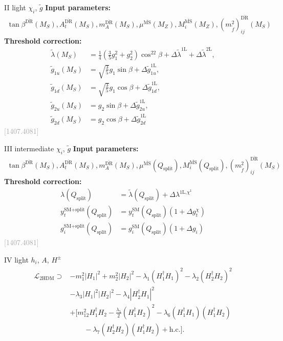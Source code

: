\documentclass[hyperref={pdfpagelabels=false},ngerman]{beamer}
\newcommand{\MS}{\ensuremath{M_S}}
\newcommand{\bigcite}[1]{\textcolor{darkgray}{[#1]}}
\renewcommand{\emph}{\textbf}
\newcommand{\DRbar}{\ensuremath{\overline{\text{DR}}}}
\newcommand{\MSbar}{\ensuremath{\overline{\text{MS}}}}
\newcommand{\SM}{\ensuremath{\text{SM}}}
\newcommand{\SplitMSSM}{\ensuremath{\text{SM+split}}\xspace}
\newcommand{\THDM}{\ensuremath{\text{2HDM}}\xspace}
\newcommand{\hc}{\ensuremath{\text{h.c.}}}
\newcommand{\Qsplit}{\ensuremath{Q_\text{split}}\xspace}
\newcommand{\Lag}{\ensuremath{\mathcal{L}}}
\newcommand{\DlSplitMSSM}[1]{\ensuremath{\Delta\tilde{\lambda}^{\text{#1L}}}}
\newcommand{\gSplitMSSM}[1]{\ensuremath{\tilde{g}_{#1}}}
\newcommand{\DgSplitMSSM}[1]{\ensuremath{\Delta\tilde{g}_{#1}^{\text{1L}}}}
\begin{document}
\begin{frame}[noframenumbering]{II light $\chi_i$, $\tilde{g}$}
  \emph{Input parameters:}
  \begin{align*}
    \tan\beta^{\DRbar}(\MS), A_t^{\DRbar}(\MS), m_A^{\DRbar}(\MS),
    \mu^{\MSbar}(M_Z), M_i^{\MSbar}(M_Z),
    (m_{\tilde{f}}^2)^{\DRbar}_{ij}(\MS)
  \end{align*}
  \emph{Threshold correction:}
  \begin{align*}
    \tilde\lambda(\MS) &= \frac{1}{4}\left(\frac{3}{5} g_1^2 + g_2^2\right)
    \cos^22\beta + \DlSplitMSSM{1} + \DlSplitMSSM{2} ,\\
    \gSplitMSSM{1u}(\MS) &= \sqrt{\frac{3}{5}} g_1 \sin\beta + \DgSplitMSSM{1u},\\
    \gSplitMSSM{1d}(\MS) &= \sqrt{\frac{3}{5}} g_1 \cos\beta + \DgSplitMSSM{1d},\\
    \gSplitMSSM{2u}(\MS) &= g_2 \sin\beta + \DgSplitMSSM{2u},\\
    \gSplitMSSM{2d}(\MS) &= g_2 \cos\beta + \DgSplitMSSM{2d}
  \end{align*}
  \hfill\bigcite{1407.4081}
\end{frame}

\begin{frame}[noframenumbering]{III intermediate  $\chi_i$, $\tilde{g}$}
  \emph{Input parameters:}
  \begin{align*}
  \tan\beta^{\DRbar}(\MS), A_t^{\DRbar}(\MS), m_A^{\DRbar}(\MS),
  \mu^{\MSbar}(\Qsplit), M_i^{\MSbar}(\Qsplit),
  (m_{\tilde{f}}^2)^{\DRbar}_{ij}(\MS)
  \end{align*}
  \emph{Threshold correction:}
  \begin{align*}
  \lambda(\Qsplit) &= \tilde\lambda(\Qsplit) + \Delta\lambda^{\text{1L,}\chi^1} \\
  y_t^\SplitMSSM(\Qsplit) &= y_t^\SM(\Qsplit) (1 + \Delta g_t^\chi) \\
  g_i^\SplitMSSM(\Qsplit) &= g_i^\SM(\Qsplit) (1 + \Delta g_i)
  \end{align*}
  \hfill\bigcite{1407.4081}
\end{frame}

\begin{frame}[noframenumbering]{IV light $h_i$, $A$, $H^{\pm}$}
\begin{align*}
\begin{split}
  \Lag_\THDM \supset
  &-m_1^2 |H_1|^2 + m_2^2 |H_2|^2
  - \lambda_1 (H_1^\dagger H_1)^2
  - \lambda_2 (H_2^\dagger H_2)^2 \\
  &- \lambda_3 |H_1|^2 |H_2|^2
  - \lambda_4 |H_2^\dagger H_1|^2\\
  &+\Bigg[ m_{12}^2 H_1^\dagger H_2
  - \frac{\lambda_5}{2} (H_1^\dagger H_2)^2
  - \lambda_6 (H_1^\dagger H_1)(H_1^\dagger H_2)\\
  &\qquad- \lambda_7 (H_2^\dagger H_2)(H_1^\dagger H_2)
  + \hc \Bigg] .
\end{split}
\end{align*}
\end{frame}
\end{document}
